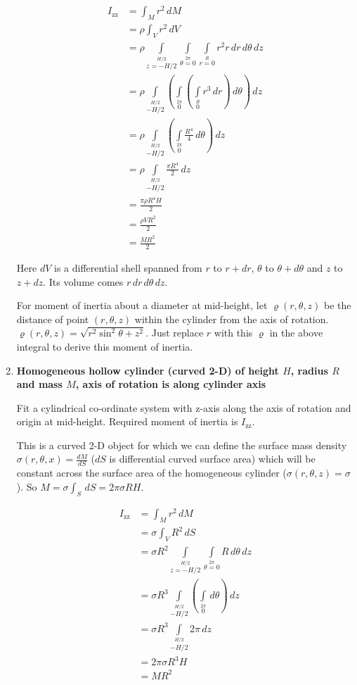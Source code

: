 \documentclass[a4paper,10pt]{article}
\begin{document}
\begin{enumerate}
\begin{align*}
I_\text{zz} &= \int_M r^2 \,dM\\
&= \rho\int_V r^2 \,dV\\
&= \rho\int\limits_{z=-H/2}\limits^{H/2}
\int\limits_{\theta=0}\limits^{2\pi}
\int\limits_{r=0}\limits^{R}r^2 r\,dr \,d\theta \,dz\\
&= \rho\int\limits_{-H/2}\limits^{H/2}
\left(\int\limits_0\limits^{2\pi}
\left(\int\limits_0\limits^{R}r^3 \,dr\right)\,d\theta\right)\,dz\\
&= \rho\int\limits_{-H/2}\limits^{H/2}
\left(\int\limits_0\limits^{2\pi}
\frac{R^4}{4} \,d\theta\right)\,dz\\
&= \rho\int\limits_{-H/2}\limits^{H/2}
\frac{\pi R^4}{2}\,dz\\
&= \frac{\pi\rho R^4 H}{2}\\
&= \frac{\rho VR^2}{2}\\
&= \frac{MR^2}{2}
\end{align*}

Here $dV$ is a differential shell spanned from $r$ to $r+dr$, $\theta$ to $\theta+d\theta$ and $z$ to $z+dz$. Its volume comes $r \,dr \,d\theta \,dz$.

For moment of inertia about a diameter at mid-height, let $\varrho(r, \theta, z)$ be the distance of point $(r, \theta, z)$ within the cylinder from the axis of rotation. $\varrho(r, \theta, z) = \sqrt{r^2 \sin^2\theta + z^2}$. Just replace $r$ with this $\varrho$ in the above integral to derive this moment of inertia.

\item \textbf{Homogeneous hollow cylinder (curved 2-D) of height $H$, radius $R$ and mass $M$, axis of rotation is along cylinder axis}

Fit a cylindrical co-ordinate system with z-axis along the axis of rotation and origin at mid-height. Required moment of inertia is $I_{\text{zz}}$.

This is a curved 2-D object for which we can define the surface mass density $\sigma(r, \theta, x) = \frac{dM}{dS}$ ($dS$ is differential curved surface area) which will be constant across the surface area of the homogeneous cylinder ($\sigma(r, \theta, z) = \sigma$). So $M = \sigma\int_S \,dS = 2\pi\sigma RH$.

\begin{align*}
I_\text{zz} &= \int_M r^2 \,dM\\
&= \sigma\int_V R^2 \,dS\\
&= \sigma R^2\int\limits_{z=-H/2}\limits^{H/2}
\int\limits_{\theta=0}\limits^{2\pi}
R \,d\theta \,dz\\
&= \sigma R^3\int\limits_{-H/2}\limits^{H/2}
\left(\int\limits_0\limits^{2\pi}
\,d\theta\right)\,dz\\
&= \sigma R^3\int\limits_{-H/2}\limits^{H/2}
2\pi\,dz\\
&= 2\pi\sigma R^3 H\\
&= MR^2
\end{align*}


\end{enumerate}
\end{document}
